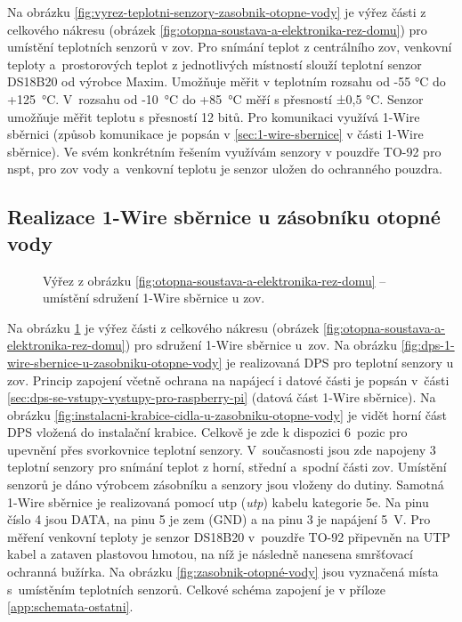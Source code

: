 Na obrázku \ref{fig:vyrez-teplotni-senzory-zasobnik-otopne-vody} je výřez části z celkového nákresu (obrázek \ref{fig:otopna-soustava-a-elektronika-rez-domu}) pro umístění teplotních senzorů v \acrshort{zov}. Pro snímání teplot z centrálního \acrshort{zov}, venkovní teploty a~prostorových teplot z jednotlivých místností slouží teplotní senzor DS18B20 \cite{vyrobce-ds18b20} od výrobce Maxim. Umožňuje měřit v teplotním rozsahu od -55 °C do +125~°C. V~rozsahu od -10~°C do +85~°C měří s přesností ±0,5 °C. Senzor umožňuje měřit teplotu s přesností 12 bitů. Pro komunikaci využívá 1-Wire sběrnici (způsob komunikace je popsán v \ref{sec:1-wire-sbernice} v části 1-Wire sběrnice). Ve svém konkrétním řešením využívám senzory v pouzdře TO-92 pro \acrshort{nspt}, pro \acrshort{zov} vody a~venkovní teplotu je senzor uložen do ochranného pouzdra.

\subsection{Realizace 1-Wire sběrnice u zásobníku otopné vody}
\begin{figure}[H]
   \centering
   \def\svgwidth{0.2\columnwidth}
   
   \caption[Výřez pro umístění sdružení 1-Wire sběrnice u \acrshort{zov}.]{Výřez z obrázku \ref{fig:otopna-soustava-a-elektronika-rez-domu} – umístění sdružení 1-Wire sběrnice u \acrshort{zov}.}
    \label{fig:vyrez-1-wire-sbernice-u-zasobniku-otopne-vody}
\end{figure}

Na obrázku \ref{fig:vyrez-1-wire-sbernice-u-zasobniku-otopne-vody} je výřez části z celkového nákresu (obrázek \ref{fig:otopna-soustava-a-elektronika-rez-domu}) pro sdružení 1-Wire sběrnice u~\acrshort{zov}. Na obrázku \ref{fig:dps-1-wire-sbernice-u-zasobniku-otopne-vody} je realizovaná DPS pro teplotní senzory u \acrshort{zov}. Princip zapojení včetně ochrana na napájecí i datové části je popsán v~části \ref{sec:dps-se-vstupy-vystupy-pro-raspberry-pi} (datová část 1-Wire sběrnice). Na obrázku \ref{fig:instalacni-krabice-cidla-u-zasobniku-otopne-vody} je vidět horní část DPS vložená do instalační krabice. Celkově je zde k dispozici 6~pozic pro upevnění přes svorkovnice teplotní senzory. V~současnosti jsou zde napojeny 3 teplotní senzory pro snímání teplot z horní, střední a~spodní části \acrshort{zov}. Umístění senzorů je dáno výrobcem zásobníku a senzory jsou vloženy do dutiny. Samotná 1-Wire sběrnice je realizovaná pomocí \acrshort{utp} (\textit{\acrlong{utp}}) kabelu kategorie 5e. Na pinu číslo 4 jsou DATA, na pinu 5 je zem (GND) a na pinu 3 je napájení 5~V. Pro měření venkovní teploty je senzor DS18B20 v~pouzdře TO-92 připevněn na UTP kabel a zataven plastovou hmotou, na níž je následně nanesena smršťovací ochranná bužírka. Na obrázku \ref{fig:zasobnik-otopné-vody} jsou vyznačená místa s~umístěním teplotních senzorů. Celkové schéma zapojení je v příloze \ref{app:schemata-ostatni}.

